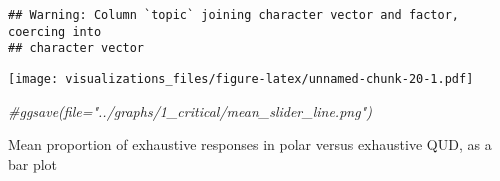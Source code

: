 \documentclass[]{article}
\newenvironment{Shaded}{\begin{snugshade}}{\end{snugshade}}
\newcommand{\KeywordTok}[1]{\textcolor[rgb]{0.13,0.29,0.53}{\textbf{#1}}}
\newcommand{\DataTypeTok}[1]{\textcolor[rgb]{0.13,0.29,0.53}{#1}}
\newcommand{\StringTok}[1]{\textcolor[rgb]{0.31,0.60,0.02}{#1}}
\newcommand{\CommentTok}[1]{\textcolor[rgb]{0.56,0.35,0.01}{\textit{#1}}}
\newcommand{\OperatorTok}[1]{\textcolor[rgb]{0.81,0.36,0.00}{\textbf{#1}}}
\newcommand{\NormalTok}[1]{#1}
\begin{document}
\begin{verbatim}
## Warning: Column `topic` joining character vector and factor, coercing into
## character vector
\end{verbatim}

\begin{Shaded}
\end{Shaded}

\texttt{[image: visualizations\_files/figure-latex/unnamed-chunk-20-1.pdf]}

\begin{Shaded}
\begin{Highlighting}[]
\CommentTok{#ggsave(file="../graphs/1_critical/mean_slider_line.png")}
\end{Highlighting}
\end{Shaded}

Mean proportion of exhaustive responses in polar versus exhaustive QUD,
as a bar plot
\end{document}
